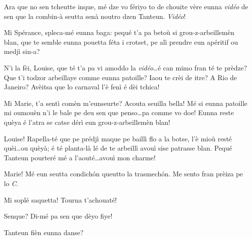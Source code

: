 \begin{drama}


\Mariespeaks Ara que no sen tcheutte inque, mé dze vo fériyo to de chouite vère eunna \textit{vidéo} de sen que la combin-à seutta senà noutro dzen Tanteun. \textit{Vidéo}!



\Louisespeaks Mi Spérance, spleca-mé eunna baga: pequé t'a pa betoù si grou-z-arbeillemèn blan, que te semble eunna pou\-et\-ta féta i crotset, pe alì prendre eun apéritif ou medjì sin-a?

\Sperancespeaks  N'i la fèi, Louise, que té t'a pa vi amoddo la \textit{vidéo}\ldots é can mimo fran té te prèdze? Que t'i todzor arbeillaye comme eunna patoille? Iaou te crèi de itre? A Rio de Janeiro? Avèitsa que lo carnaval l'è fenì é dèi tchica!

\Louisespeaks Mi Marie, t’a sentì comèn m’eunseurte? Acouta seuilla bella! Mé si eunna patoille mi oumouèn n'i le bale pe deu sen que penso\ldots pa comme vo doe! Eunna reste quèya é l'atra se catse dérì eun grou-z-arbeillemèn blan!

\Alicespeaks  Louise! Rapella-té que pe prédjì maque pe baillì flo a la botse, l’è mioù resté quèi\ldots ou quèyà;  é té planta-là lé de te arbeillì avouì sise patrasse blan. Pequé Tanteun pourteré mé a l’aouté\ldots avouì mon charme!


\Sperancespeaks Marie! Mé eun seutta condich\'on queutto la trasmech\'on. Me sento fran prèiza pe lo \textit{C}.


\Alicespeaks Mi soplé saquetta! Tourna t'achouaté!

\Sperancespeaks Senque? Di-mé pa sen que dèyo fiye!


\Louisespeaks{} Tanteun fièn eunna danse?



\end{drama}
